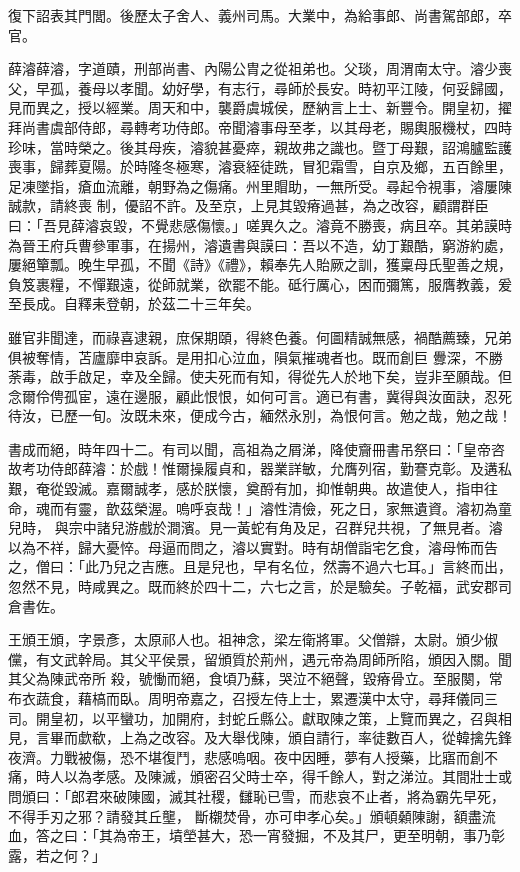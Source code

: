 \begin{pinyinscope}
 復下詔表其門閭。後歷太子舍人、義州司馬。大業中，為給事郎、尚書駕部郎，卒官。



 薛濬薛濬，字道賾，刑部尚書、內陽公胄之從祖弟也。父琰，周渭南太守。濬少喪父，早孤，養母以孝聞。幼好學，有志行，尋師於長安。時初平江陵，何妥歸國，見而異之，授以經業。周天和中，襲爵虞城侯，歷納言上士、新豐令。開皇初，擢拜尚書虞部侍郎，尋轉考功侍郎。帝聞濬事母至孝，以其母老，賜輿服機杖，四時珍味，當時榮之。後其母疾，濬貌甚憂瘁，親故弗之識也。暨丁母艱，詔鴻臚監護喪事，歸葬夏陽。於時隆冬極寒，濬衰絰徒跣，冒犯霜雪，自京及鄉，五百餘里，足凍墜指，瘡血流離，朝野為之傷痛。州里賵助，一無所受。尋起令視事，濬屢陳誠款，請終喪
 制，優詔不許。及至京，上見其毀瘠過甚，為之改容，顧謂群臣曰：「吾見薛濬哀毀，不覺悲感傷懷。」嗟異久之。濬竟不勝喪，病且卒。其弟謨時為晉王府兵曹參軍事，在揚州，濬遺書與謨曰：吾以不造，幼丁艱酷，窮游約處，屢絕簞瓢。晚生早孤，不聞《詩》《禮》，賴奉先人貽厥之訓，獲稟母氏聖善之規，負笈裹糧，不憚艱遠，從師就業，欲罷不能。砥行厲心，困而彌篤，服膺教義，爰至長成。自釋耒登朝，於茲二十三年矣。



 雖官非聞達，而祿喜逮親，庶保期頤，得終色養。何圖精誠無感，禍酷薦臻，兄弟俱被奪情，苫廬靡申哀訴。是用扣心泣血，隕氣摧魂者也。既而創巨
 釁深，不勝荼毒，啟手啟足，幸及全歸。使夫死而有知，得從先人於地下矣，豈非至願哉。但念爾伶俜孤宦，遠在邊服，顧此恨恨，如何可言。適已有書，冀得與汝面訣，忍死待汝，已歷一旬。汝既未來，便成今古，緬然永別，為恨何言。勉之哉，勉之哉！



 書成而絕，時年四十二。有司以聞，高祖為之屑涕，降使齎冊書吊祭曰：「皇帝咨故考功侍郎薛濬：於戲！惟爾操履貞和，器業詳敏，允膺列宿，勤謇克彰。及遘私艱，奄從毀滅。嘉爾誠孝，感於朕懷，奠酹有加，抑惟朝典。故遣使人，指申往命，魂而有靈，歆茲榮渥。嗚呼哀哉！」濬性清儉，死之日，家無遺資。濬初為童兒時，
 與宗中諸兒游戲於澗濱。見一黃蛇有角及足，召群兒共視，了無見者。濬以為不祥，歸大憂悴。母逼而問之，濬以實對。時有胡僧詣宅乞食，濬母怖而告之，僧曰：「此乃兒之吉應。且是兒也，早有名位，然壽不過六七耳。」言終而出，忽然不見，時咸異之。既而終於四十二，六七之言，於是驗矣。子乾福，武安郡司倉書佐。



 王頒王頒，字景彥，太原祁人也。祖神念，梁左衛將軍。父僧辯，太尉。頒少俶儻，有文武幹局。其父平侯景，留頒質於荊州，遇元帝為周師所陷，頒因入關。聞其父為陳武帝所
 殺，號慟而絕，食頃乃蘇，哭泣不絕聲，毀瘠骨立。至服闋，常布衣蔬食，藉槁而臥。周明帝嘉之，召授左侍上士，累遷漢中太守，尋拜儀同三司。開皇初，以平蠻功，加開府，封蛇丘縣公。獻取陳之策，上覽而異之，召與相見，言畢而歔欷，上為之改容。及大舉伐陳，頒自請行，率徒數百人，從韓擒先鋒夜濟。力戰被傷，恐不堪復鬥，悲感嗚咽。夜中因睡，夢有人授藥，比寤而創不痛，時人以為孝感。及陳滅，頒密召父時士卒，得千餘人，對之涕泣。其間壯士或問頒曰：「郎君來破陳國，滅其社稷，讎恥已雪，而悲哀不止者，將為霸先早死，不得手刃之邪？請發其丘壟，
 斷櫬焚骨，亦可申孝心矣。」頒頓顙陳謝，額盡流血，答之曰：「其為帝王，墳塋甚大，恐一宵發掘，不及其尸，更至明朝，事乃彰露，若之何？」




\end{pinyinscope}
